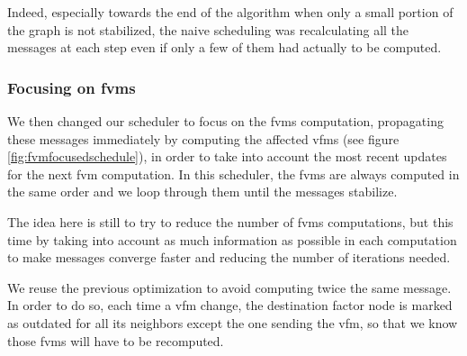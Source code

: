 \documentclass[a4paper,11pt]{report}
\begin{document}
Indeed, especially towards the end of the algorithm when only a small portion of the graph is not stabilized, the naive scheduling was recalculating all the messages at each step even if only a few of them had actually to be computed.


\subsubsection{Focusing on \acp{fvm}}

We then changed our scheduler to focus on the \acp{fvm} computation, propagating these messages immediately by computing the affected \acp{vfm} (see figure \ref{fig:fvmfocusedschedule}), in order to take into account the most recent updates for the next \ac{fvm} computation. In this scheduler, the \acp{fvm} are always computed in the same order and we loop through them until the messages stabilize.

The idea here is still to try to reduce the number of \acp{fvm} computations, but this time by taking into account as much information as possible in each computation to make messages converge faster and reducing the number of iterations needed.

We reuse the previous optimization to avoid computing twice the same message. In order to do so, each time a \ac{vfm} change, the destination factor node is marked as outdated for all its neighbors except the one sending the \ac{vfm}, so that we know those \acp{fvm} will have to be recomputed.

\end{document}
